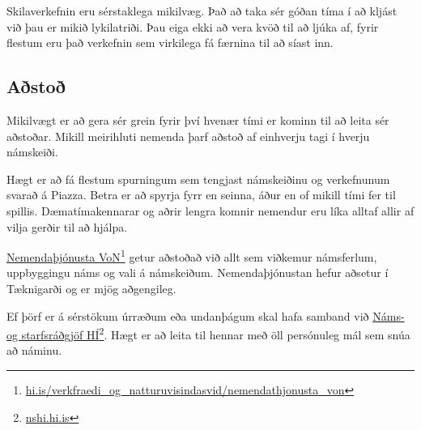 \documentclass[justified, nobib]{tufte-handout}
\begin{document}
Skilaverkefnin eru sérstaklega mikilvæg. Það að taka sér góðan tíma í að kljást við þau er mikið lykilatriði. Þau eiga ekki að vera kvöð til að ljúka af, fyrir flestum eru það verkefnin sem virkilega fá færnina til að síast inn.
\subsection{Aðstoð}
\label{sec:help}
Mikilvægt er að gera sér grein fyrir því hvenær tími er kominn til að leita sér aðstoðar. Mikill meirihluti nemenda þarf aðstoð af einhverju tagi í hverju námskeiði.

Hægt er að fá flestum spurningum sem tengjast námskeiðinu og verkefnunum svarað á Piazza. Betra er að spyrja fyrr en seinna, áður en of mikill tími fer til spillis. Dæmatímakennarar og aðrir lengra komnir nemendur eru líka alltaf allir af vilja gerðir til að hjálpa.

\href{http://www.hi.is/verkfraedi\_og\_natturuvisindasvid/nemendathjonusta\_von}{Nemendaþjónusta VoN}\footnote{\url{hi.is/verkfraedi_og_natturuvisindasvid/nemendathjonusta_von}} getur aðstoðað við allt sem viðkemur námsferlum, uppbyggingu náms og vali á námskeiðum. Nemendaþjónustan hefur aðsetur í Tæknigarði og er mjög aðgengileg.

Ef þörf er á sérstökum úrræðum eða undanþágum skal hafa samband við \href{http://nshi.hi.is/}{Náms- og starfsráðgjöf HÍ}\footnote{\url{nshi.hi.is}}. Hægt er að leita til hennar með öll persónuleg mál sem snúa að náminu.
\end{document}
